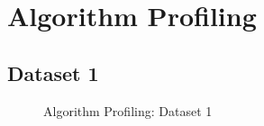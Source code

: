 \appendix

\chapter{Algorithm Profiling}
\label{apdx:algorithmProfiling}

\section{Dataset 1}
\begin{figure}[htbp]
\centering
{}
\caption{Algorithm Profiling: Dataset 1}
\end{figure}

